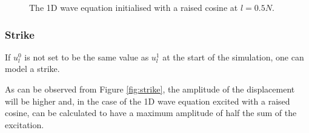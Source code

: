 \begin{figure}[h]
    \caption{The 1D wave equation initialised with a raised cosine at $l=0.5N$.\label{fig:raisedCos}}
\end{figure}

\subsubsection{Strike}\label{sec:strike}
If $u^0_l$ is not set to be the same value as $u_l^1$ at the start of the simulation, one can model a strike. 

As can be observed from Figure \ref{fig:strike}, the amplitude of the displacement will be higher and, in the case of the 1D wave equation excited with a raised cosine, can be calculated to have a maximum amplitude of half the sum of the excitation. 


